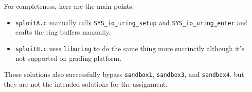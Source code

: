 \documentclass[11pt]{article}
\begin{document}
For completeness, here are the main points:
\begin{itemize}
    \item \texttt{sploitA.c} manually calls \texttt{SYS\_io\_uring\_setup} and \texttt{SYS\_io\_uring\_enter}
          and crafts the ring buffers manually.
    \item \texttt{sploitB.c} uses \texttt{liburing} to do the same thing more succinctly although it's not supported on grading platform.
\end{itemize}
Those solutions also successfully bypass \texttt{sandbox1}, \texttt{sandbox3}, and \texttt{sandbox4}, but
they are not the intended solutions for the assignment.
\end{document}
